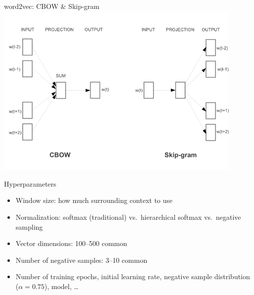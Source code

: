 \documentclass[xcolor=pdftex,x11names,table,hyperref]{beamer}
\begin{document}
\begin{frame}{word2vec: CBOW \& Skip-gram}
\includegraphics[width=0.90\textwidth]{images/mikolov-etal2013b_fig1.png}
\end{frame}


\begin{frame}{Hyperparameters}
\begin{itemize}
	\item Window size: how much surrounding context to use
	\item Normalization: softmax (traditional) vs.\ hierarchical softmax vs.\ negative sampling
	\item Vector dimensions: 100--500 common
	\item Number of negative samples: 3--10 common
	\item Number of training epochs, initial learning rate, negative sample distribution ($\alpha = 0.75$), model, \ldots
\end{itemize}
\end{frame}
\end{document}
